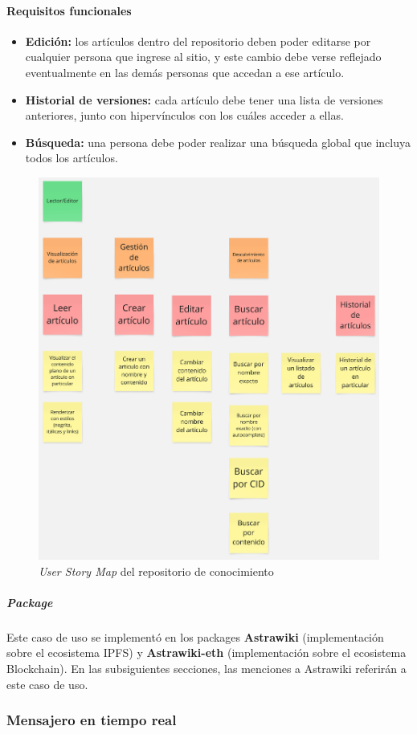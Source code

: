 \paragraph{Requisitos funcionales}

\begin{itemize}
    \item \textbf{Edición:} los artículos dentro del repositorio deben poder editarse por cualquier persona que ingrese al sitio, y este cambio debe verse reflejado eventualmente en las demás personas que accedan a ese artículo.
    \item \textbf{Historial de versiones:} cada artículo debe tener una lista de versiones anteriores, junto con hipervínculos con los cuáles acceder a ellas.
    \item \textbf{Búsqueda:} una persona debe poder realizar una búsqueda global que incluya todos los artículos.
\end{itemize}

\begin{figure}[H]
    \centering
    \includegraphics[width=0.5\linewidth]{img/solucion-wiki/usm-wiki.jpg}
    \caption{\textit{User Story Map} del repositorio de conocimiento}
    \label{fig:usm-wiki}
\end{figure}

\subparagraph{Package}

Este caso de uso se implementó en los packages \textbf{Astrawiki} \cite{astrawiki-ipfs} (implementación sobre el ecosistema IPFS) y \textbf{Astrawiki-eth} \cite{astrawiki-eth} (implementación sobre el ecosistema Blockchain). En las subsiguientes secciones, las menciones a Astrawiki referirán a este caso de uso.

\subsubsection{Mensajero en tiempo real}

